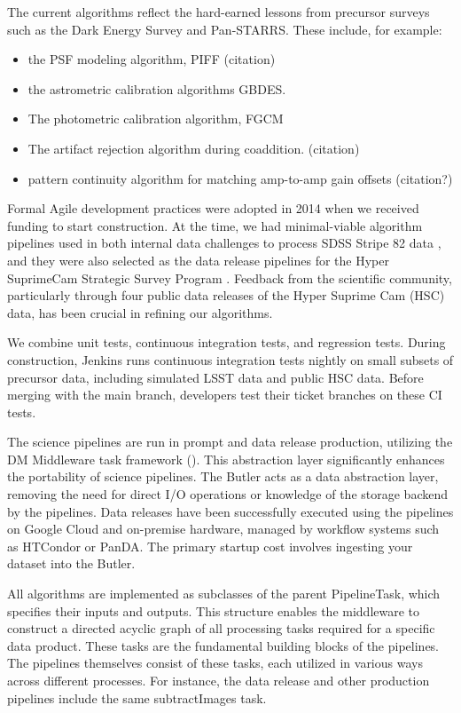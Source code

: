 The current algorithms reflect the hard-earned lessons from precursor surveys such as the Dark Energy Survey and Pan-STARRS.
These include, for example:
\begin{itemize}
\item the PSF modeling algorithm, PIFF (citation)
\item the astrometric calibration algorithms GBDES. \citep{2017PASP..129g4503B}
\item The photometric calibration algorithm, FGCM \citep{2018AJ....155...41B}
\item The artifact rejection algorithm during coaddition. (citation)
\item pattern continuity algorithm for matching amp-to-amp gain offsets (citation?)
\end{itemize}

Formal Agile development practices were adopted in 2014 when we received funding to start construction. At the time, we had minimal-viable algorithm pipelines used in both internal data challenges to process SDSS Stripe 82 data \citep{2010SPIE.7740E..1OK,DMTN-034,DMTN-035}, and they were also selected as the data release pipelines for the Hyper SuprimeCam Strategic Survey Program \citep{2018PASJ...70S...5B}. Feedback from the scientific community, particularly through four public data releases of the Hyper Suprime Cam (HSC) data, has been crucial in refining our algorithms.

We combine unit tests, continuous integration tests, and regression tests. During construction, Jenkins runs continuous integration tests nightly on small subsets of precursor data, including simulated  LSST data and public HSC data. Before merging with the main branch, developers test their ticket branches on these CI tests.

The science pipelines are run in prompt and data release production, utilizing the DM Middleware task framework (). This abstraction layer significantly enhances the portability of science pipelines. The Butler acts as a data abstraction layer, removing the need for direct I/O operations or knowledge of the storage backend by the pipelines. Data releases have been successfully executed using the pipelines on Google Cloud and on-premise hardware, managed by workflow systems such as HTCondor or PanDA. The primary startup cost involves ingesting your dataset into the Butler.

All algorithms are implemented as subclasses of the parent PipelineTask, which specifies their inputs and outputs. This structure enables the middleware to construct a directed acyclic graph of all processing tasks required for a specific data product. These tasks are the fundamental building blocks of the pipelines. The pipelines themselves consist of these tasks, each utilized in various ways across different processes. For instance, the data release and other production pipelines include the same subtractImages task.

